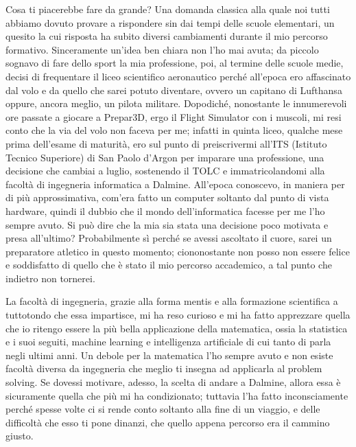 
Cosa ti piacerebbe fare da grande? Una domanda classica alla quale noi tutti abbiamo dovuto provare a rispondere sin dai tempi delle scuole elementari, un quesito la cui risposta ha subito diversi cambiamenti durante il mio percorso formativo. Sinceramente un’idea ben chiara non l’ho mai avuta; da piccolo sognavo di fare dello sport la mia professione, poi, al termine delle scuole medie, decisi di frequentare il liceo scientifico aeronautico perché all’epoca ero affascinato dal volo e da quello che sarei potuto diventare, ovvero un capitano di Lufthansa oppure, ancora meglio, un pilota militare. Dopodiché, nonostante le innumerevoli ore passate a giocare a Prepar3D, ergo il Flight Simulator con i muscoli, mi resi conto che la via del volo non faceva per me; infatti in quinta liceo, qualche mese prima dell’esame di maturità, ero sul punto di preiscrivermi all’ITS (Istituto Tecnico Superiore) di San Paolo d’Argon per imparare una professione, una decisione che cambiai a luglio, sostenendo il TOLC e immatricolandomi alla facoltà di ingegneria informatica a Dalmine. All’epoca conoscevo, in maniera per di più approssimativa, com’era fatto un computer soltanto dal punto di vista hardware, quindi il dubbio che il mondo dell’informatica facesse per me l’ho sempre avuto. Si può dire che la mia sia stata una decisione poco motivata e presa all’ultimo? Probabilmente sì perché se avessi ascoltato il cuore, sarei un preparatore atletico in questo momento; ciononostante non posso non essere felice e soddisfatto di quello che è stato il mio percorso accademico, a tal punto che indietro non tornerei.
\par La facoltà di ingegneria, grazie alla forma mentis e alla formazione scientifica a tuttotondo che essa impartisce, mi ha reso curioso e mi ha fatto apprezzare quella che io ritengo essere la più bella applicazione della matematica, ossia la statistica e i suoi seguiti, machine learning e intelligenza artificiale di cui tanto di parla negli ultimi anni. Un debole per la matematica l’ho sempre avuto e non esiste facoltà diversa da ingegneria che meglio ti insegna ad applicarla al problem solving. Se dovessi  motivare, adesso, la scelta di andare a Dalmine, allora essa è sicuramente quella che più mi ha condizionato; tuttavia l’ha fatto inconsciamente perché spesse volte ci si rende conto soltanto alla fine di un viaggio, e delle difficoltà che esso ti pone dinanzi, che quello appena percorso era il cammino giusto.
